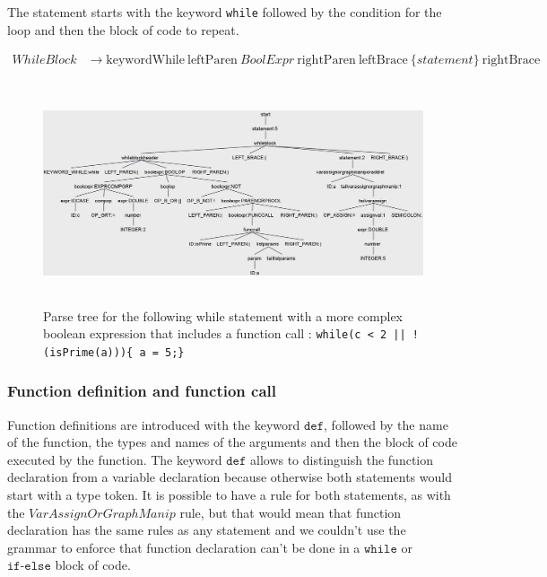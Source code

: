 The statement starts with the keyword \texttt{while} followed by the condition for the loop and then the block of code to repeat.

\begin{align*}
\mathit{WhileBlock} &\rightarrow \text{keywordWhile} \: \text{leftParen} \: \mathit{BoolExpr} \: \text{rightParen} \: \text{leftBrace} \: \{ \mathit{statement}\} \: \text{rightBrace}
\end{align*}

\begin{figure}[H]
    \centering
    \includegraphics[height = 6.5cm]{figures/parse_trees/parseTree_whileblock}
    \caption{Parse tree for the following while statement with a more complex boolean expression that includes a function call : \texttt{while(c < 2 || !(isPrime(a)))\{
        a = 5;\}}}
    \label{fig:parseTree_whileblock}
\end{figure}

\subsubsection*{Function definition and function call}

Function definitions are introduced with the keyword $\texttt{def}$, followed by the name of the function, the types and names of the arguments and then the block of code executed by the function.
The keyword $\texttt{def}$ allows to distinguish the function declaration from a variable declaration because otherwise both statements would start with a type token.
It is possible to have a rule for both statements, as with the $\mathit{VarAssignOrGraphManip}$ rule, but that would mean that function declaration has the same rules as any statement and we couldn't use the grammar to enforce that function declaration can't be done in a $\texttt{while}$ or $\texttt{if-else}$ block of code.\\

